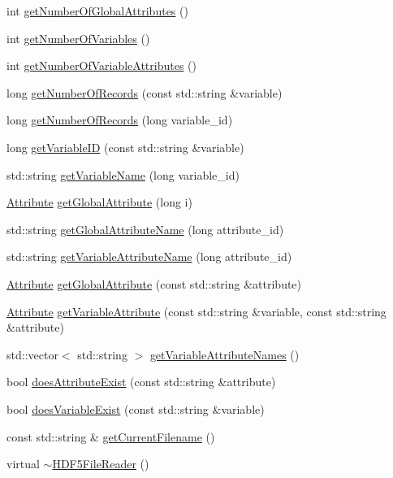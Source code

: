 \begin{DoxyCompactItemize}
int \hyperlink{classccmc_1_1_h_d_f5_file_reader_a45bedc5f59d3c0c56778463f82c1a48e}{getNumberOfGlobalAttributes} ()
\item 
int \hyperlink{classccmc_1_1_h_d_f5_file_reader_a038ff97710e89d57bccbc5ad9509d277}{getNumberOfVariables} ()
\item 
int \hyperlink{classccmc_1_1_h_d_f5_file_reader_abf30f40a7f95a65c9c5fbfb638a0b3e6}{getNumberOfVariableAttributes} ()
\item 
long \hyperlink{classccmc_1_1_h_d_f5_file_reader_af54630ca885c698be2ffbefac7b236e2}{getNumberOfRecords} (const std::string \&variable)
\item 
long \hyperlink{classccmc_1_1_h_d_f5_file_reader_af1c8021e432d165c10d754f0a067d7f0}{getNumberOfRecords} (long variable\_\-id)
\item 
long \hyperlink{classccmc_1_1_h_d_f5_file_reader_a1172c9abfe37a6e0bd9556a841457740}{getVariableID} (const std::string \&variable)
\item 
std::string \hyperlink{classccmc_1_1_h_d_f5_file_reader_add8a20386da8a7188a5a67a35cbb94eb}{getVariableName} (long variable\_\-id)
\item 
\hyperlink{classccmc_1_1_attribute}{Attribute} \hyperlink{classccmc_1_1_h_d_f5_file_reader_ae58b480499186a84535f616687e75a7c}{getGlobalAttribute} (long i)
\item 
std::string \hyperlink{classccmc_1_1_h_d_f5_file_reader_adfa3cf1ea14b0e05eb03915851c561c4}{getGlobalAttributeName} (long attribute\_\-id)
\item 
std::string \hyperlink{classccmc_1_1_h_d_f5_file_reader_aa53c82e359a5af886ae96ebdf801cf89}{getVariableAttributeName} (long attribute\_\-id)
\item 
\hyperlink{classccmc_1_1_attribute}{Attribute} \hyperlink{classccmc_1_1_h_d_f5_file_reader_abc4eb472a8eb35aeb133e3b54f239de0}{getGlobalAttribute} (const std::string \&attribute)
\item 
\hyperlink{classccmc_1_1_attribute}{Attribute} \hyperlink{classccmc_1_1_h_d_f5_file_reader_a30acff0de40e77d8e6ee15bbdf68942c}{getVariableAttribute} (const std::string \&variable, const std::string \&attribute)
\item 
std::vector$<$ std::string $>$ \hyperlink{classccmc_1_1_h_d_f5_file_reader_a5e97e629beec751e0da373f5a1e4c6d9}{getVariableAttributeNames} ()
\item 
bool \hyperlink{classccmc_1_1_h_d_f5_file_reader_ac421d19d5c59697a0117dfa763d77de0}{doesAttributeExist} (const std::string \&attribute)
\item 
bool \hyperlink{classccmc_1_1_h_d_f5_file_reader_ad2753042d297a408ad4c1128a9e2939d}{doesVariableExist} (const std::string \&variable)
\item 
const std::string \& \hyperlink{classccmc_1_1_h_d_f5_file_reader_ae19127c20fa9b5ec6cebfeea3578476f}{getCurrentFilename} ()
\item 
virtual \hyperlink{classccmc_1_1_h_d_f5_file_reader_a255f413aabbdf4c694934725444bb178}{$\sim$HDF5FileReader} ()
\end{DoxyCompactItemize}
